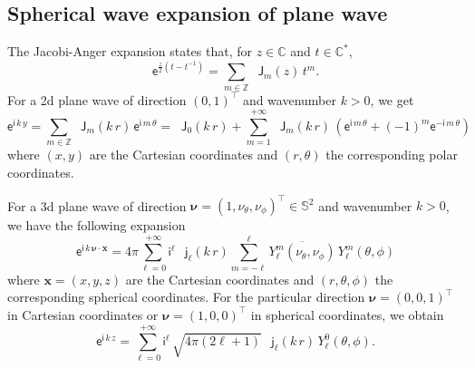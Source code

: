 \documentclass[12pt,a4paper]{article}
\theoremstyle{definition}
\theoremstyle{plain}
\theoremstyle{remark}
\newcommand{\bbC}{\mathbb{C}}
\newcommand{\bbS}{\mathbb{S}}
\newcommand{\bbZ}{\mathbb{Z}}
\newcommand{\ex}{\mathsf{e}}
\newcommand{\im}{\mathsf{i}}
\newcommand{\bJ}{\mathop{}\!\mathsf{J}}
\newcommand{\bj}{\mathop{}\!\mathsf{j}}
\newcommand{\plr}[1]{\left(#1\right)}
\newcommand{\vect}[1]{\boldsymbol{#1}}
\newcommand{\vx}{\boldsymbol{x}}
\begin{document}
\subsection{Spherical wave expansion of plane wave}\label{sec:plane_wave_expan}

The Jacobi-Anger expansion \cite[Eq.~10.12.1]{NIST:DLMF} states that, for $z \in \bbC$ and $t \in \bbC^*$,
\[
    \ex^{\frac{z}{2}(t-t^{-1})} = \sum_{m \in \bbZ} \bJ_m(z)\, t^m.
\]
For a 2d plane wave of direction $(0, 1)^\intercal$ and wavenumber $k > 0$, we get
\begin{equation}\label{eq:wave_expan_2}
    \ex^{\im\, k\, y} = \sum_{m \in \bbZ} \bJ_m(k\, r)\, \ex^{\im\, m\, \theta}
    = \bJ_0(k\, r) + \sum_{m = 1}^{+\infty} \bJ_m(k\, r)\, \plr{\ex^{\im\, m\, \theta} + (-1)^m\ex^{-\im\, m\, \theta}}
\end{equation}
where $(x, y)$ are the Cartesian coordinates and $(r, \theta)$ the corresponding polar coordinates.

\bigskip

For a 3d plane wave of direction $\vect{\nu} = (1, \nu_\theta, \nu_\phi)^\intercal \in \bbS^2$ and wavenumber $k > 0$, we have the following expansion
\[
    \ex^{\im\, k\, \vect{\nu} \cdot \vx} = 4\pi \sum_{\ell = 0}^{+\infty} \im^\ell\, \bj_\ell(k\, r) \sum_{m = -\ell}^\ell \overline{Y_\ell^m(\nu_\theta, \nu_\phi)}\, Y_\ell^m(\theta, \phi)
\]
where $\vx = (x, y, z)$ are the Cartesian coordinates and $(r, \theta, \phi)$ the corresponding spherical coordinates.
For the particular direction $\vect{\nu} = (0, 0, 1)^\intercal$ in Cartesian coordinates or $\vect{\nu} = (1, 0, 0)^\intercal$ in spherical coordinates, we obtain
\begin{equation}\label{eq:wave_expan_3}
    \ex^{\im\, k\, z} = \sum_{\ell = 0}^{+\infty} \im^\ell \,\sqrt{4\pi(2\ell+1)}\, \bj_\ell(k\, r)\, Y_\ell^0(\theta, \phi).
\end{equation}



\end{document}
